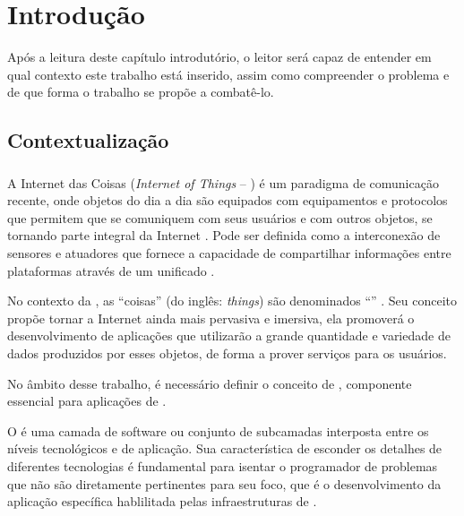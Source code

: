 \chapter{Introdução}

Após a leitura deste capítulo introdutório, o leitor será capaz de entender em qual contexto este trabalho está inserido, assim como compreender o problema e de que forma o trabalho se propõe a combatê-lo.

\section{Contextualização}

\subsection{\iot{}}

A Internet das Coisas (\textit{Internet of Things} -- \iot) é um paradigma de comunicação recente, onde objetos do dia a dia são equipados com equipamentos e protocolos que permitem que se comuniquem com seus usuários e com outros objetos, se tornando parte integral da Internet \cite{Atzori:2010}.  Pode ser definida como a interconexão de sensores e atuadores que fornece a capacidade de compartilhar informações entre plataformas através de um \framework{} unificado \cite{gubbi2013internet}. 

No contexto da \iot{}, as ``coisas'' (do inglês: \textit{things}) são denominados ``\smartobjs'' \cite{bandyopadhyay2011internet}. Seu conceito propõe tornar a Internet ainda mais pervasiva e imersiva, ela promoverá o desenvolvimento de aplicações que utilizarão a grande quantidade e variedade de dados produzidos por esses objetos, de forma a prover serviços para os usuários. 


No âmbito desse trabalho, é necessário definir o conceito de \middleware{}, componente essencial para aplicações de \iot{}.
\begin{citacao}
	O \middleware{} é uma camada de software ou conjunto de subcamadas interposta entre os níveis tecnológicos e de aplicação. Sua característica de esconder os detalhes de diferentes tecnologias é fundamental para isentar o programador de problemas que não são diretamente pertinentes para seu foco, que é o desenvolvimento da aplicação específica hablilitada pelas infraestruturas de \iot{} \cite[tradução~nossa]{Atzori:2010}.
\end{citacao}

